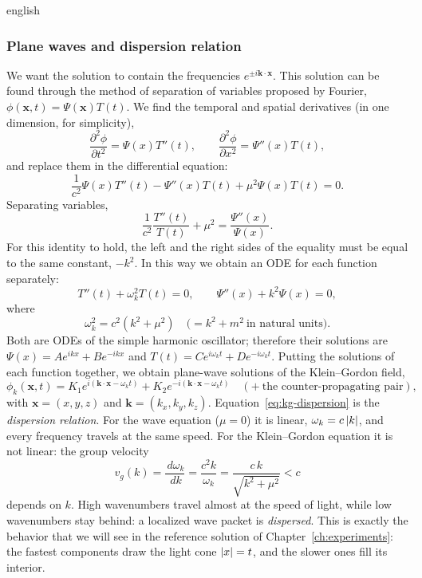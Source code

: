 \documentclass[0000.tex]{subfiles}
\begin{document}
\begin{hyphenrules}{english}
\subsubsection{Plane waves and dispersion relation}
We want the solution to contain the frequencies $e^{\pm i\mathbf{k}\cdot\mathbf{x}}$. This solution can be found
through the method of separation of variables proposed by Fourier, $\phi(\mathbf{x},t)=\Psi(\mathbf{x})T(t)$. We find
the temporal and spatial derivatives (in one dimension, for simplicity),
\begin{equation}
  \frac{\partial^2\phi}{\partial t^2}=\Psi(x)T''(t),\qquad
  \frac{\partial^2\phi}{\partial x^2}=\Psi''(x)T(t),
  \label{eq:kg-sep-1}
\end{equation}
and replace them in the differential equation:
\begin{equation}
  \frac{1}{c^2}\Psi(x)T''(t)-\Psi''(x)T(t)+\mu^2\Psi(x)T(t)=0.
  \label{eq:kg-sep-2}
\end{equation}
Separating variables,
\[
  \frac{1}{c^2}\frac{T''(t)}{T(t)}+\mu^2=\frac{\Psi''(x)}{\Psi(x)}.
\]
For this identity to hold, the left and the right sides of the equality must be equal to the same
constant, $-k^2$. In this way we obtain an ODE for each function separately:
\begin{equation}
  T''(t)+\omega_k^2T(t)=0,\qquad \Psi''(x)+k^2\Psi(x)=0,
  \label{eq:kg-odes}
\end{equation}
where
\begin{equation}
  \omega_k^2=c^2(k^2+\mu^2)\quad\big(=k^2+m^2\ \text{in natural units}\big).
  \label{eq:kg-dispersion}
\end{equation}
Both are ODEs of the simple harmonic oscillator; therefore their solutions are
$\Psi(x)=Ae^{ikx}+Be^{-ikx}$ and $T(t)=Ce^{i\omega_kt}+De^{-i\omega_kt}$. Putting the solutions of each
function together, we obtain plane-wave solutions of the Klein--Gordon field,
\begin{equation}
  \phi_k(\mathbf{x},t)=K_1e^{i(\mathbf{k}\cdot\mathbf{x}-\omega_kt)}+K_2e^{-i(\mathbf{k}\cdot\mathbf{x}-\omega_kt)}
  \quad(+\ \text{the counter-propagating pair}),
  \label{eq:kg-planewave}
\end{equation}
with $\mathbf{x}=(x,y,z)$ and $\mathbf{k}=(k_x,k_y,k_z)$. Equation~\eqref{eq:kg-dispersion} is the \emph{dispersion
relation}. For the wave equation ($\mu=0$) it is linear, $\omega_k=c\left\lvert k \right\rvert$, and every frequency
travels at the same speed. For the Klein--Gordon equation it is not linear: the group velocity
\begin{equation}
  v_g(k)=\frac{\,d\omega_k}{\,d k}=\frac{c^2k}{\omega_k}=\frac{c\,k}{\sqrt{k^2+\mu^2}}<c
  \label{eq:kg-group-velocity}
\end{equation}
depends on $k$. High wavenumbers travel almost at the speed of light, while low wavenumbers stay behind:
a localized wave packet is \emph{dispersed}. This is exactly the behavior that we will see in the
reference solution of Chapter~\ref{ch:experiments}: the fastest components draw the light cone $\left\lvert x \right\rvert=t$,
and the slower ones fill its interior.


\end{hyphenrules}
\end{document}
